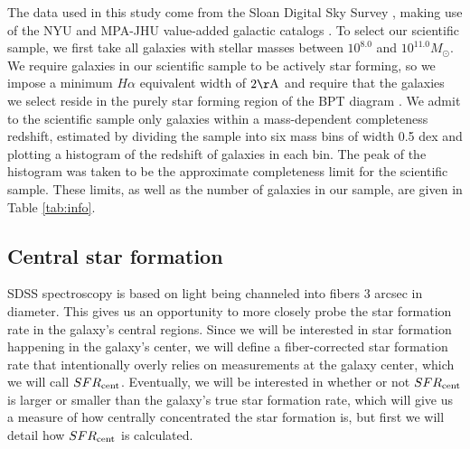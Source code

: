 \documentclass[iop]{emulateapj}
\begin{document}
The data used in this study come from the Sloan Digital Sky Survey \citep[SDSS,][]{SDSS}, making use of the NYU and MPA-JHU value-added galactic catalogs \citep{Kauffmann03,Brinchmann04,blanton05vagc}. To select our scientific sample, we first take all galaxies with stellar masses between $10^{8.0}$ and $10^{11.0} M_{\odot}$. We require galaxies in our scientific sample to be actively star forming, so we impose a minimum $H\alpha$ equivalent width of $2 \rm \AA$ and require that the galaxies we select reside in the purely star forming region of the BPT diagram \citep{BPT}. We admit to the scientific sample only galaxies within a mass-dependent completeness redshift, estimated by dividing the sample into six mass bins of width 0.5 dex and plotting a histogram of the redshift of galaxies in each bin. The peak of the histogram was taken to be the approximate completeness limit for the scientific sample. These limits, as well as the number of galaxies in our sample, are given in Table \ref{tab:info}.


\subsection{Central star formation}
\label{sec:fibercor}
SDSS spectroscopy is based on light being channeled into fibers $3$ arcsec in diameter. This gives us an opportunity to more closely probe the star formation rate in the galaxy's central regions. Since we will be interested in star formation happening in the galaxy's center, we will define a fiber-corrected star formation rate that intentionally overly relies on measurements at the galaxy center, which we will call $SFR_{\rm cent}$. Eventually, we will be interested in whether or not $SFR_{\rm cent}$ is larger or smaller than the galaxy's true star formation rate, which will give us a measure of how centrally concentrated the star formation is, but first we will detail how $SFR_{\rm cent}$ is calculated.
\end{document}
